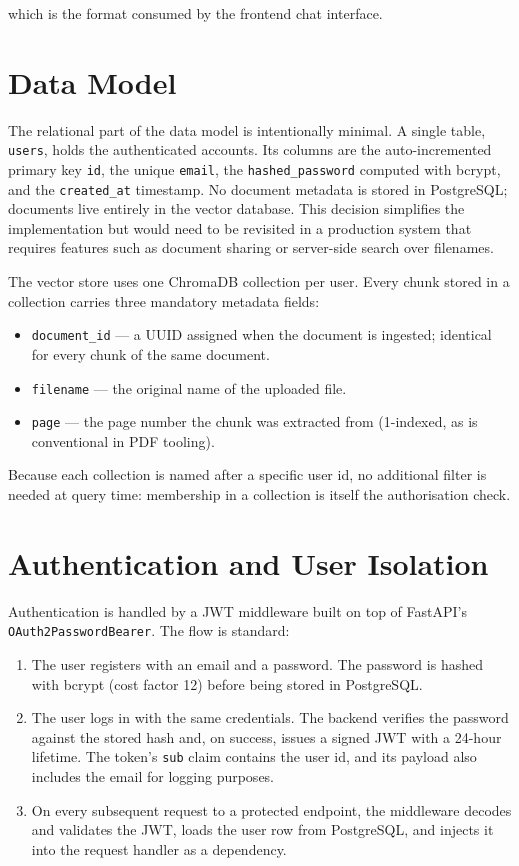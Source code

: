 \noindent which is the format consumed by the frontend chat interface.

\section{Data Model}
\label{sec:data-model}

The relational part of the data model is intentionally minimal. A single
table, \texttt{users}, holds the authenticated accounts. Its columns are
the auto-incremented primary key \texttt{id}, the unique \texttt{email},
the \texttt{hashed\_password} computed with bcrypt, and the
\texttt{created\_at} timestamp. No document metadata is stored in
PostgreSQL; documents live entirely in the vector database. This decision
simplifies the implementation but would need to be revisited in a
production system that requires features such as document sharing or
server-side search over filenames.

The vector store uses one ChromaDB collection per user. Every chunk stored
in a collection carries three mandatory metadata fields:

\begin{itemize}
  \item \texttt{document\_id} --- a UUID assigned when the document is
        ingested; identical for every chunk of the same document.
  \item \texttt{filename} --- the original name of the uploaded file.
  \item \texttt{page} --- the page number the chunk was extracted from
        (1-indexed, as is conventional in PDF tooling).
\end{itemize}

Because each collection is named after a specific user id, no additional
filter is needed at query time: membership in a collection is itself the
authorisation check.

\section{Authentication and User Isolation}
\label{sec:auth-architecture}

Authentication is handled by a JWT middleware built on top of FastAPI's
\texttt{OAuth2PasswordBearer}. The flow is standard:

\begin{enumerate}
  \item The user registers with an email and a password. The password is
        hashed with bcrypt (cost factor 12) before being stored in
        PostgreSQL.
  \item The user logs in with the same credentials. The backend verifies
        the password against the stored hash and, on success, issues a
        signed JWT with a 24-hour lifetime. The token's \texttt{sub}
        claim contains the user id, and its payload also includes the
        email for logging purposes.
  \item On every subsequent request to a protected endpoint, the
        middleware decodes and validates the JWT, loads the user row
        from PostgreSQL, and injects it into the request handler as a
        dependency.
\end{enumerate}

